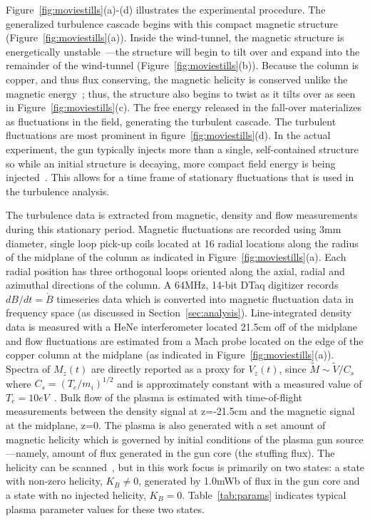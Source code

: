 \documentclass[aps,prl,amsmath,amssymb,reprint,superscriptaddress]{revtex4-1} %
\begin{document}
Figure~\ref{fig:moviestills}(a)-(d) illustrates the experimental procedure. The generalized turbulence cascade begins with this compact magnetic structure (Figure~\ref{fig:moviestills}(a)). Inside the wind-tunnel, the magnetic structure is energetically unstable~\cite{bondeson81,jarboe93}---the structure will begin to tilt over and expand into the remainder of the wind-tunnel (Figure~\ref{fig:moviestills}(b)). Because the column is copper, and thus flux conserving, the magnetic helicity is conserved unlike the magnetic energy~\cite{taylor86}; thus, the structure also begins to twist as it tilts over as seen in Figure~\ref{fig:moviestills}(c). The free energy released in the fall-over materializes as fluctuations in the field, generating the turbulent cascade. The turbulent fluctuations are most prominent in figure~\ref{fig:moviestills}(d). In the actual experiment, the gun typically injects more than a single, self-contained structure so while an initial structure is decaying, more compact field energy is being injected~\cite{barnes86}. This allows for a time frame of stationary fluctuations that is used in the turbulence analysis.

The turbulence data is extracted from magnetic, density and flow measurements during this stationary period. Magnetic fluctuations are recorded using 3mm diameter, single loop pick-up coils located at 16 radial locations along the radius of the midplane of the column as indicated in Figure~\ref{fig:moviestills}(a). Each radial position has three orthogonal loops oriented along the axial, radial and azimuthal directions of the column. A 64MHz, 14-bit DTaq digitizer records $dB/dt = \dot{B}$ timeseries data which is converted into magnetic fluctuation data in frequency space (as discussed in Section~\ref{sec:analysis}). Line-integrated density data is measured with a HeNe interferometer located 21.5cm off of the midplane and flow fluctuations are estimated from a Mach probe located on the edge of the copper column at the midplane (as indicated in Figure~\ref{fig:moviestills}(a)). Spectra of $M_{z}(t)$ are directly reported as a proxy for $V_{z}(t)$, since $\tilde{M}\sim \tilde{V}/C_{s}$ where $C_{s}=(T_{e}/m_{i})^{1/2}$ and is approximately constant with a measured value of $T_{e}=10eV$~\cite{zhang11, schaffner14b}. Bulk flow of the plasma is estimated with time-of-flight measurements between the density signal at z=-21.5cm and the magnetic signal at the midplane, z=0. The plasma is also generated with a set amount of magnetic helicity which is governed by initial conditions of the plasma gun source---namely, amount of flux generated in the gun core (the stuffing flux). The helicity can be scanned~\cite{schaffner14b}, but in this work focus is primarily on two states: a state with non-zero helicity, $K_{B}\neq 0$, generated by 1.0mWb of flux in the gun core and a state with no injected helicity, $K_{B}=0$. Table~\ref{tab:params} indicates typical plasma parameter values for these two states.
\end{document}
